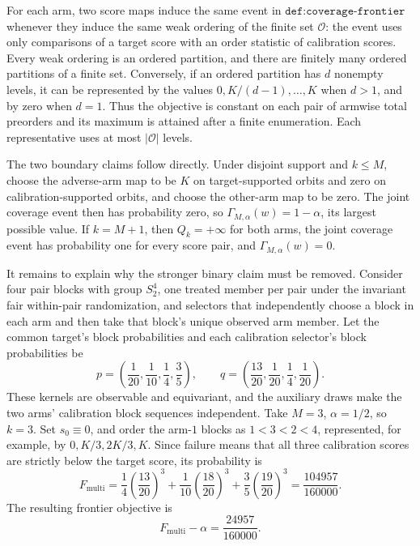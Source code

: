 For each arm, two score maps induce the same event in \(\texttt{def:coverage-frontier}\) whenever they induce the same weak ordering of the finite set \(\mathcal O\): the event uses only comparisons of a target score with an order statistic of calibration scores. Every weak ordering is an ordered partition, and there are finitely many ordered partitions of a finite set. Conversely, if an ordered partition has \(d\) nonempty levels, it can be represented by the values \(0,K/(d-1),\ldots,K\) when \(d>1\), and by zero when \(d=1\). Thus the objective is constant on each pair of armwise total preorders and its maximum is attained after a finite enumeration. Each representative uses at most \(|\mathcal O|\) levels.

The two boundary claims follow directly. Under disjoint support and \(k\le M\), choose the adverse-arm map to be \(K\) on target-supported orbits and zero on calibration-supported orbits, and choose the other-arm map to be zero. The joint coverage event then has probability zero, so \(\Gamma_{M,\alpha}(w)=1-\alpha\), its largest possible value. If \(k=M+1\), then \(Q_k=+\infty\) for both arms, the joint coverage event has probability one for every score pair, and \(\Gamma_{M,\alpha}(w)=0\).

It remains to explain why the stronger binary claim must be removed. Consider four pair blocks with group \(S_2^4\), one treated member per pair under the invariant fair within-pair randomization, and selectors that independently choose a block in each arm and then take that block's unique observed arm member. Let the common target's block probabilities and each calibration selector's block probabilities be \[p=\left(\frac1{20},\frac1{10},\frac14,\frac35\right),\qquad q=\left(\frac{13}{20},\frac1{20},\frac14,\frac1{20}\right).\tag{5}\] These kernels are observable and equivariant, and the auxiliary draws make the two arms' calibration block sequences independent. Take \(M=3\), \(\alpha=1/2\), so \(k=3\). Set \(s_0\equiv0\), and order the arm-\(1\) blocks as \(1<3<2<4\), represented, for example, by \(0,K/3,2K/3,K\). Since failure means that all three calibration scores are strictly below the target score, its probability is \[F_{\mathrm{multi}}=\frac14\left(\frac{13}{20}\right)^3+\frac1{10}\left(\frac{18}{20}\right)^3+\frac35\left(\frac{19}{20}\right)^3=\frac{104957}{160000}.\tag{6}\] The resulting frontier objective is \[F_{\mathrm{multi}}-\alpha=\frac{24957}{160000}.\tag{7}\]

